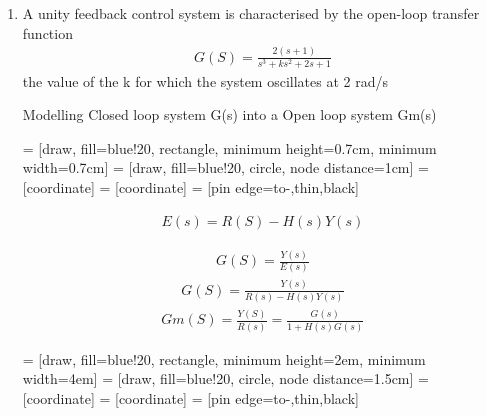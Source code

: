 \begin{enumerate}[label=\thesection.\arabic*.,ref=\thesection.\theenumi]
\item A unity feedback control system is characterised by the open-loop transfer function
\begin{align}
G(S) = \frac{2(s+1)}{s^3 + ks^2 + 2s +1}
\end{align}
the value of the k for which the system oscillates at 2 rad/s

\solution
Modelling Closed loop system G(s) into a Open loop system Gm(s)

 = [draw, fill=blue!20, rectangle, 
    minimum height=0.7cm, minimum width=0.7cm]
 = [draw, fill=blue!20, circle, node distance=1cm]
 = [coordinate]
 = [coordinate]
 = [pin edge={to-,thin,black}]



\begin{align}
E(s) = R(S) - H(s)Y(s)
\end{align}

\begin{align}
 G(S) = \frac{Y(s)}{E(s)}
\end{align}
\begin{align}
 G(S) = \frac{Y(s)}{R(s) - H(s)Y(s)}
\end{align}
\begin{align}
 Gm(S) = \frac{Y(S)}{R(s)} = \frac{G(s)}{1 + H(s)G(s)}\label{sys_res}
\end{align}


 = [draw, fill=blue!20, rectangle, 
    minimum height=2em, minimum width=4em]
 = [draw, fill=blue!20, circle, node distance=1.5cm]
 = [coordinate]
 = [coordinate]
 = [pin edge={to-,thin,black}]


\end{enumerate}
